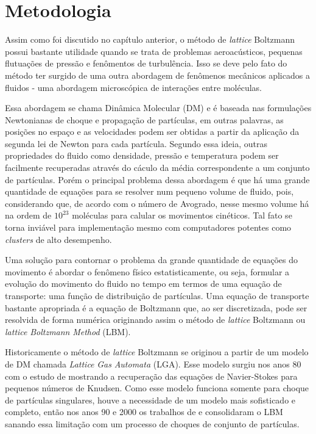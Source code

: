 \chapter{Metodologia}

Assim como foi discutido no capítulo anterior, o método de \textit{lattice} Boltzmann possui bastante utilidade quando se trata de problemas aeroacústicos, pequenas flutuações de pressão e fenômentos de turbulência. Isso se deve pelo fato do método ter surgido de uma outra abordagem de fenômenos mecânicos aplicados a fluidos - uma abordagem microscópica de interações entre moléculas.

Essa abordagem se chama Dinâmica Molecular (DM) e é baseada nas formulações Newtonianas de choque e propagação de partículas, em outras palavras, as posições no espaço e as velocidades podem ser obtidas a partir da aplicação da segunda lei de Newton para cada partícula. Segundo essa ideia, outras propriedades do fluido como densidade, pressão e temperatura podem ser facilmente recuperadas através do cáculo da média correspondente a um conjunto de partículas. Porém o principal problema dessa abordagem é que há uma grande quantidade de equações para se resolver num pequeno volume de fluido, pois, considerando que, de acordo com o número de Avogrado, nesse mesmo volume há na ordem de $10^{23}$ moléculas para calular os movimentos cinéticos. Tal fato se torna inviável para implementação mesmo com computadores potentes como \textit{clusters} de alto desempenho.

Uma solução para contornar o problema da grande quantidade de equações do movimento é abordar o fenômeno físico estatisticamente, ou seja, formular a evolução do movimento do fluido no tempo em termos de uma equação de transporte: uma função de distribuição de partículas. Uma equação de transporte bastante apropriada é a equação de Boltzmann que, ao ser discretizada, pode ser resolvida de forma numérica originando assim o método de \textit{lattice} Boltzmann ou \textit{lattice} \textit{Boltzmann} \textit{Method} (LBM).

Historicamente o método de \textit{lattice} Boltzmann se originou a partir de um modelo de DM chamada \textit{Lattice} \textit{Gas} \textit{Automata} (LGA). Esse modelo surgiu nos anos 80 com o estudo de  mostrando a recuperação das equações de Navier-Stokes para pequenos números de Knudsen. Como esse modelo funciona somente para choque de partículas singulares, houve a necessidade de um modelo mais sofisticado e completo, então nos anos 90 e 2000 os trabalhos de  e  consolidaram o LBM sanando essa limitação com um processo de choques de conjunto de partículas.

